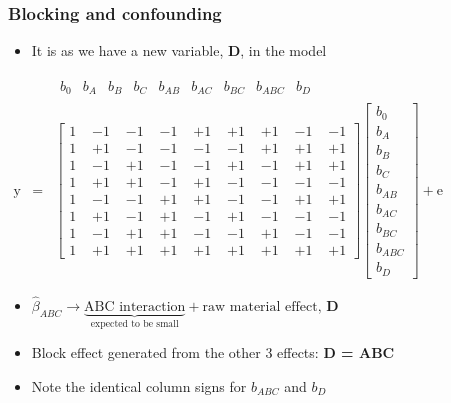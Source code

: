 \begin{frame}\frametitle{Blocking and confounding}
	\begin{itemize}
		\item	It is as we have a new variable, \textbf{D}, in the model
	\end{itemize}

	$
	\begin{array}{rcl}
		& &
		\begin{matrix}
			b_0 & b_A & b_B & b_{C} & b_{AB} & b_{AC}& b_{BC} &b_{ABC} & b_{D}
		\end{matrix}
		\\
		\mathrm{y} &=&
		\begin{bmatrix}
			1\,\, & -1\,\, & -1\,\, & -1\,\, & +1\,\, & +1\,\, & +1\,\, & -1\,\, & -1\\
			1 & +1 & -1 & -1 & -1 & -1 & +1 & +1 & +1\\
			1 & -1 & +1 & -1 & -1 & +1 & -1 & +1 & +1\\
			1 & +1 & +1 & -1 & +1 & -1 & -1 & -1 & -1\\
			1 & -1 & -1 & +1 & +1 & -1 & -1 & +1 & +1\\
			1 & +1 & -1 & +1 & -1 & +1 & -1 & -1 & -1\\
			1 & -1 & +1 & +1 & -1 & -1 & +1 & -1 & -1\\
			1 & +1 & +1 & +1 & +1 & +1 & +1 & +1 & +1
		\end{bmatrix}
		\begin{bmatrix}
			b_0 \\
			b_A \\
			b_B \\
			b_{C} \\
			b_{AB} \\
			b_{AC} \\
			b_{BC} \\
			b_{ABC} \\
			b_{D}
		\end{bmatrix}
		+ \mathrm{e}
	\end{array}
	$
	\begin{itemize}
		\item	$\widehat{\beta}_{ABC} \rightarrow \underbrace{\text{ABC interaction}}_{\text{expected to be small}} + \text{raw material effect, }\mathbf{D}$
		\item	Block effect generated from the other 3 effects: \textbf{D = ABC}
		\item	Note the identical column signs for $b_{ABC}$ and $b_{D}$
	\end{itemize}
\end{frame}


